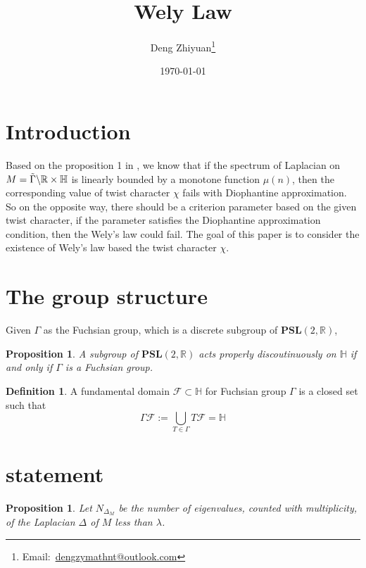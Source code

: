 \documentclass[12pt,a4paper,english]{article}
\title{Wely Law}
\date{\today}
\author{Deng Zhiyuan\footnote{Email:\ \href{mailto:dengzymathnt@outlook.com}{dengzymathnt@outlook.com}}}
\theoremstyle{plain}
\newtheorem{prop}[thm]{Proposition}
\theoremstyle{definition}
\newtheorem{defi}{Definition}
\theoremstyle{remark}
\begin{document}
\maketitle
\newpage

\tableofcontents
\newpage

\section{Introduction}
Based on the proposition 1 in \cite{hoffmann1991cuspidal}, we know that if the spectrum of Laplacian on $M=\Tilde{\Gamma}\backslash\mathbb{R}\times\mathbb{H}$ is linearly bounded by a monotone function $\mu(n)$, then the corresponding value of twist character $\chi$ fails with Diophantine approximation.  So on the opposite way, there should be a criterion parameter based on the given twist character, if the parameter satisfies the Diophantine approximation condition, then the Wely's law could fail. The goal of this paper is to consider the existence of Wely's law based the twist character $\chi$.

\section{The group structure} 
Given $\Gamma$ as the Fuchsian group, which is a discrete subgroup of $\textbf{PSL}(2,\mathbb{R})$, 
\begin{prop}
    A subgroup of $\textbf{PSL}(2,\mathbb{R})$ acts properly discoutinuously on $\mathbb{H}$ if and only if $\Gamma$ is a Fuchsian group.
\end{prop}
\begin{defi}
    A fundamental domain $\mathcal{F}\subset \mathbb{H}$ for Fuchsian group $\Gamma$ is a closed set such that 
    \begin{equation*}
        \Gamma\mathcal{F}:=\bigcup_{T\in\Gamma}T\mathcal{F}=\mathbb{H}
    \end{equation*}
\end{defi}

\section{statement}
\begin{prop}
Let $N_{\Delta_{M}}$ be the number of eigenvalues, counted with multiplicity, of the Laplacian $\Delta$ of $M$ less than $\lambda$.   
\end{prop}
\newpage


\end{document}
